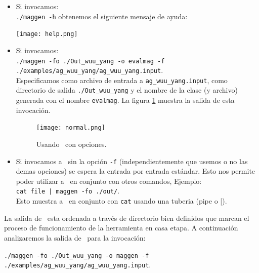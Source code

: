 \begin{itemize}
\item Si invocamos:\\ \texttt{./maggen -h} obtenemos el siguiente mensaje de ayuda:
\begin{center}
\texttt{[image: help.png]}
\end{center}
\item Si invocamos: \\ \texttt{./maggen -fo ./Out\_wuu\_yang -o evalmag -f ./examples/ag\_wuu\_yang/ag\_wuu\_yang.input}. \\ Especificamos como archivo de entrada a \texttt{ag\_wuu\_yang.input}, como directorio de salida \texttt{./Out\_wuu\_yang} y el nombre de la clase (y archivo) generada con el nombre \texttt{evalmag}. La figura \ref{fig:outnormal} muestra la salida de esta invocación.
\begin{figure}\centering
\texttt{[image: normal.png]}
\caption{\label{fig:outnormal} Usando \maggen\ con opciones.}
\end{figure}

\item Si invocamos a \maggen\ sin la opción \texttt{-f} (independientemente que usemos o no las demas opciones) se espera la entrada por entrada estándar. Esto nos permite poder utilizar a \maggen\ en conjunto con otros comandos, Ejemplo:\\ \texttt{cat file | maggen -fo ./out/}.\\ Esto muestra a \maggen\ en conjunto con \texttt{cat} usando una tuberia (pipe o |).

\end{itemize}

La salida de \maggen\ esta ordenada a través de directorio bien definidos que marcan el proceso de funcionamiento de la herramienta en casa etapa. A continuación analizaremos la salida de \maggen\ para la invocación:

\texttt{./maggen -fo ./Out\_wuu\_yang -o maggen -f ./examples/ag\_wuu\_yang/ag\_wuu\_yang.input}.


